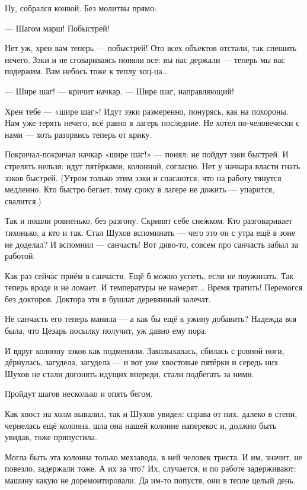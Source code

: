 Ну, собрался конвой. Без молитвы прямо:

--- Шагом марш! Побыстрей!

Нет уж, хрен вам теперь --- побыстрей! Ото всех объектов отстали, так спешить нечего. Зэки и не
сговариваясь поняли все: вы нас держали --- теперь мы вас подержим. Вам небось тоже к теплу
хоц-ца...

--- Шире шаг! --- кричит начкар. --- Шире шаг, направляющий!

Хрен тебе --- «шире шаг»! Идут зэки размеренно, понурясь, как на похороны. Нам уже терять
нечего, всё равно в лагерь последние. Не хотел по-человечески с нами --- хоть разорвись теперь
от крику.

Покричал-покричал начкар «шире шаг!» --- понял: не пойдут зэки быстрей. И стрелять нельзя: идут
пятёрками, колонной, согласно. Нет у начкара власти гнать зэков быстрей. (Утром только этим
зэки и спасаются, что на работу тянутся медленно. Кто быстро бегает, тому сроку в лагере не
дожить --- упарится, свалится.)

Так и пошли ровненько, без разгону. Скрипят себе снежком. Кто разговаривает тихонько, а кто и
так. Стал Шухов вспоминать --- чего это он с утра ещё в зоне не доделал? И вспомнил --- санчасть!
Вот диво-то, совсем про санчасть забыл за работой.

Как раз сейчас приём в санчасти. Ещё б можно успеть, если не поужинать. Так теперь вроде и не
ломает. И температуры не намерят... Время тратить! Перемогся без докторов. Доктора эти в
бушлат деревянный залечат.

Не санчасть его теперь манила --- а как бы ещё к ужину добавить? Надежда вся была, что Цезарь
посылку получит, уж давно ему пора.

И вдруг колонну зэков как подменили. Заколыхалась, сбилась с ровной ноги, дёрнулась,
загудела, загудела --- и вот уже хвостовые пятёрки и середь них Шухов не стали догонять идущих
впереди, стали подбегать за ними.

Пройдут шагов несколько и опять бегом.

Как хвост на холм вывалил, так и Шухов увидел: справа от них, далеко в степи, чернелась ещё
колонна, шла она нашей колонне наперекос и, должно быть увидав, тоже припустила.

Могла быть эта колонна только мехзавода, в ней человек триста. И им, значит, не повезло,
задержали тоже. А их за что? Их, случается, и по работе задерживают: машину какую не
доремонтировали. Да им-то попустя, они в тепле целый день.

